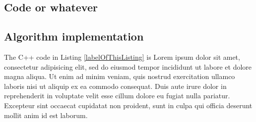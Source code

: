 \begin{appendices}

\chapter{Code or whatever}

\section{Algorithm implementation}
\label{sec:algorithm_implementation}

The C++ code in Listing \ref{labelOfThisListing} is Lorem ipsum dolor sit amet, consectetur adipisicing elit, sed do eiusmod
tempor incididunt ut labore et dolore magna aliqua. Ut enim ad minim veniam,
quis nostrud exercitation ullamco laboris nisi ut aliquip ex ea commodo
consequat. Duis aute irure dolor in reprehenderit in voluptate velit esse
cillum dolore eu fugiat nulla pariatur. Excepteur sint occaecat cupidatat non
proident, sunt in culpa qui officia deserunt mollit anim id est laborum.




\end{appendices}